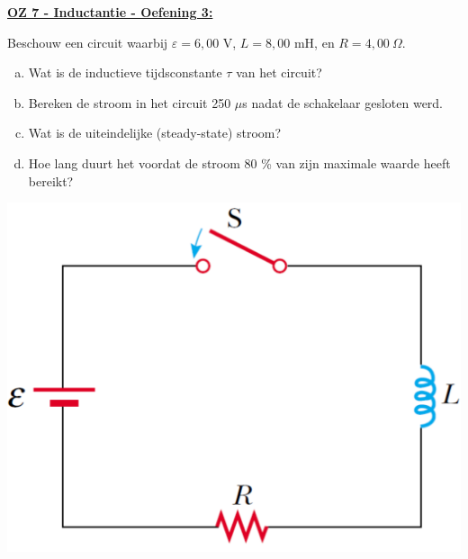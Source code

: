 \textbf{\underline{OZ 7 - Inductantie - Oefening 3:}}
\vspace{0.5cm}

Beschouw een circuit waarbij $ \varepsilon = 6,00 $ V, $ L = 8,00 $ mH, en $ R = 4,00 \ \Omega $.

\vspace{0.3cm}
\begin{minipage}{.75\textwidth}
    \begin{enumerate}[(a)]
        \item Wat is de inductieve tijdsconstante $ \tau $ van het circuit?
        \item Bereken de stroom in het circuit 250 $ \mu $s nadat de schakelaar gesloten werd.
        \item Wat is de uiteindelijke (steady-state) stroom?
        \item Hoe lang duurt het voordat de stroom 80 \% van zijn maximale waarde heeft bereikt?
    \end{enumerate}
\end{minipage}
\hspace{0.75cm}\begin{minipage}{.21\textwidth}
    \vspace{-0.5cm}\begin{center}
        \includegraphics[scale = 0.28]{oz07/resources/oef-1-opgave.png}
    \end{center}
\end{minipage}



